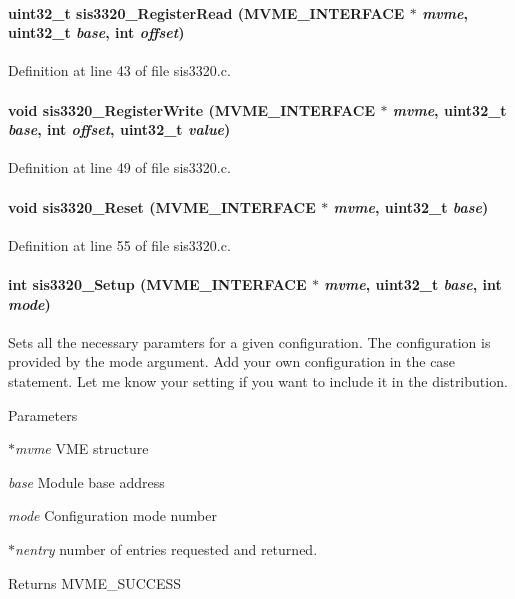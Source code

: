 \paragraph[{sis3320\_\-RegisterRead}]{\setlength{\rightskip}{0pt plus 5cm}uint32\_\-t sis3320\_\-RegisterRead ({\bf MVME\_\-INTERFACE} $\ast$ {\em mvme}, \/  uint32\_\-t {\em base}, \/  int {\em offset})}\hfill\label{sis3320_8c_a250e2792b274958ebe3034a5728a5055}


Definition at line 43 of file sis3320.c.
\paragraph[{sis3320\_\-RegisterWrite}]{\setlength{\rightskip}{0pt plus 5cm}void sis3320\_\-RegisterWrite ({\bf MVME\_\-INTERFACE} $\ast$ {\em mvme}, \/  uint32\_\-t {\em base}, \/  int {\em offset}, \/  uint32\_\-t {\em value})}\hfill\label{sis3320_8c_aca1c2af91de4bfc46bc75bbb41fdba23}


Definition at line 49 of file sis3320.c.
\paragraph[{sis3320\_\-Reset}]{\setlength{\rightskip}{0pt plus 5cm}void sis3320\_\-Reset ({\bf MVME\_\-INTERFACE} $\ast$ {\em mvme}, \/  uint32\_\-t {\em base})}\hfill\label{sis3320_8c_aff4671c8f06907a3cd63c72489c23eb4}


Definition at line 55 of file sis3320.c.
\paragraph[{sis3320\_\-Setup}]{\setlength{\rightskip}{0pt plus 5cm}int sis3320\_\-Setup ({\bf MVME\_\-INTERFACE} $\ast$ {\em mvme}, \/  uint32\_\-t {\em base}, \/  int {\em mode})}\hfill\label{sis3320_8c_a82a1d41eb9db90c6723165a71cba97b8}
Sets all the necessary paramters for a given configuration. The configuration is provided by the mode argument. Add your own configuration in the case statement. Let me know your setting if you want to include it in the distribution. 
\begin{DoxyParams}{Parameters}
\item[{\em $\ast$mvme}]VME structure \item[{\em base}]Module base address \item[{\em mode}]Configuration mode number \item[{\em $\ast$nentry}]number of entries requested and returned. \end{DoxyParams}
\begin{DoxyReturn}{Returns}
MVME\_\-SUCCESS 
\end{DoxyReturn}


